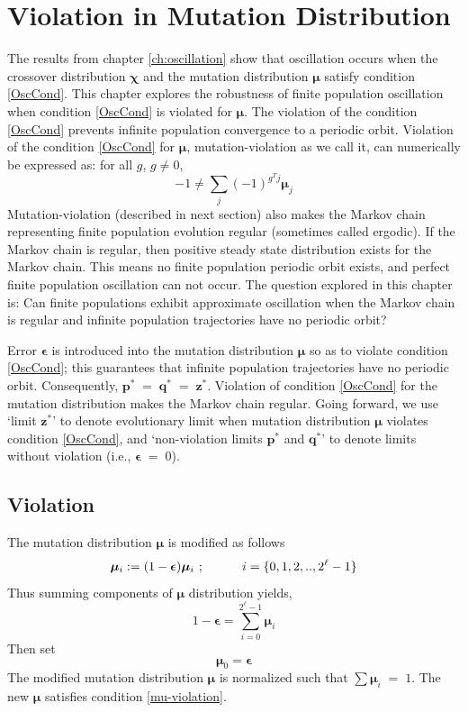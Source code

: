 \chapter{Violation in Mutation Distribution} \label{ch:muviolation}
The results from chapter \ref{ch:oscillation} show that oscillation occurs
when the crossover distribution $\bm{\chi}$ and the mutation distribution $\bm{\mu}$ 
satisfy condition \ref{OscCond}. This chapter explores the robustness of 
finite population oscillation when condition \ref{OscCond} is violated for $\bm{\mu}$. 
The violation of the condition \ref{OscCond} prevents 
infinite population convergence to a periodic orbit. 
Violation of the condition \ref{OscCond} for $\bm{\mu}$, mutation-violation as we call it, 
can numerically be expressed as:\newline  
for all $g$,  $g \neq 0$,
\begin{equation}
\label{mu-violation}
  -1 \neq \sum \limits_{j} (-1)^{g^T j} \bm{\mu}_j  
\end{equation}
Mutation-violation (described in next section) also makes 
the Markov chain representing finite population evolution regular 
(sometimes called ergodic). If the Markov chain is regular, 
then positive steady state distribution exists for the Markov chain. 
This means no finite population periodic orbit exists, 
and perfect finite population oscillation can not occur. 
The question explored in this chapter is: Can finite populations exhibit approximate oscillation when the
Markov chain is regular and infinite population trajectories
have no periodic orbit?

Error $\bm{\epsilon}$ is introduced into the mutation distribution $\bm{\mu}$ so as to 
violate condition \ref{OscCond}; this guarantees that 
infinite population trajectories have no periodic orbit. Consequently, $\bm{p}^\ast \;=\; \bm{q}^\ast \;=\; \bm{z}^\ast$. 
Violation of condition \ref{OscCond} for the mutation distribution makes the Markov chain regular. 
Going forward, we use `limit $\bm{z}^\ast$' to denote evolutionary limit when mutation distribution $\bm{\mu}$ 
violates condition \ref{OscCond}, and 
`non-violation limits $\bm{p}^\ast$ and $\bm{q}^\ast$' to denote limits without violation (i.e., $\bm{\epsilon} \;=\; 0$).

\section{Violation}
The mutation distribution $\bm{\mu}$ is modified as follows
\[
\bm{\mu}_i := (1-\bm{\epsilon}) \bm{\mu}_i \hspace{0.01in}\;; \hspace{30pt} i = \{0, 1, 2,.., 2^{\ell}-1\}
\]
Thus summing components of $\bm{\mu}$ distribution yields, 
\[
1-\bm{\epsilon} = \sum \limits_{i=0}^{2^{\ell}-1} \bm{\mu}_i
\]
Then set
\[
\bm{\mu}_0 = \bm{\epsilon}
\]
The modified mutation distribution $\bm{\mu}$ is normalized such that  $\sum \bm{\mu}_i \;=\; 1$.
The new $\bm{\mu}$ satisfies condition \ref{mu-violation}.

